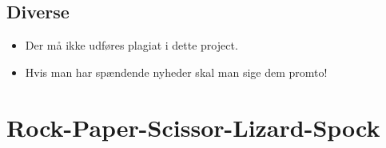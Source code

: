 \documentclass{article}
\begin{document}
\subsection{Diverse}
\begin{itemize}
	\item Der må ikke udføres plagiat i dette project.
	\item Hvis man har spændende nyheder skal man sige dem promto!
\end{itemize}

\appendix
\section{Rock-Paper-Scissor-Lizard-Spock}
\label{app:game}
\end{document}
